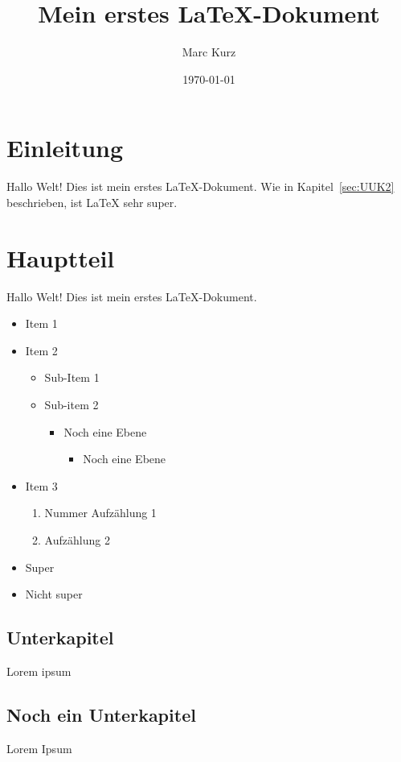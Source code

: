 \documentclass[a4paper,11pt]{article}
\title{Mein erstes \LaTeX-Dokument}
\author{Marc Kurz}
\date{\today}
\begin{document}
\maketitle

\section{Einleitung}
Hallo Welt! Dies ist mein erstes LaTeX-Dokument.
Wie in Kapitel~\ref{sec:UUK2} beschrieben, ist \LaTeX{} sehr super.

\section{Hauptteil}
Hallo Welt! Dies ist mein erstes LaTeX-Dokument.

\begin{itemize}
    \item Item 1
    \item Item 2
    \begin{itemize}
        \item Sub-Item 1
        \item Sub-item 2
        \begin{itemize}
            \item Noch eine Ebene
            \begin{itemize}
                \item Noch eine Ebene
            \end{itemize}
        \end{itemize}
    \end{itemize}
    \item Item 3
    \begin{enumerate}
        \item Nummer Aufzählung 1
        \item Aufzählung 2
    \end{enumerate}
\end{itemize}

\begin{itemize}
    \item[+] Super
    \item[-] Nicht super
\end{itemize}

\subsection{Unterkapitel}
Lorem ipsum

\subsection{Noch ein Unterkapitel}
Lorem Ipsum
\end{document}
